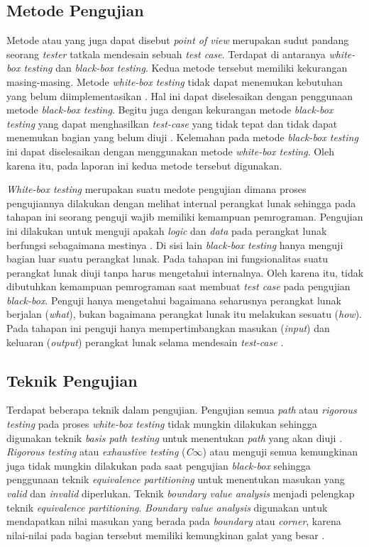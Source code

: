 \subsection{Metode Pengujian}

Metode atau yang juga dapat disebut \emph{point of view} merupakan
sudut pandang seorang \emph{tester} tatkala mendesain sebuah
\emph{test case}. Terdapat di antaranya \emph{white-box testing} dan
\emph{black-box testing}. Kedua metode tersebut memiliki kekurangan
masing-masing. Metode \emph{white-box testing} tidak dapat menemukan
kebutuhan yang belum diimplementasikan
\parencite{dijkstra1970notes}. Hal ini dapat diselesaikan dengan
penggunaan metode \emph{black-box testing}. Begitu juga dengan
kekurangan metode \emph{black-box testing} yang dapat menghasilkan
\emph{test-case} yang tidak tepat dan tidak dapat menemukan bagian
yang belum diuji \parencite{savenkov2008become}. Kelemahan pada metode
\emph{black-box testing} ini dapat diselesaikan dengan menggunakan
metode \emph{white-box testing}. Oleh karena itu, pada laporan ini
kedua metode tersebut digunakan.

\emph{White-box testing} merupakan suatu medote pengujian dimana
proses pengujiannya dilakukan dengan melihat internal perangkat lunak
sehingga pada tahapan ini seorang penguji wajib memiliki kemampuan
pemrograman. Pengujian ini dilakukan untuk menguji apakah \emph{logic}
dan \emph{data} pada perangkat lunak berfungsi sebagaimana mestinya
\parencite{myers2011art}. Di sisi lain \emph{black-box testing} hanya
menguji bagian luar suatu perangkat lunak. Pada tahapan ini
fungsionalitas suatu perangkat lunak diuji tanpa harus mengetahui
internalnya. Oleh karena itu, tidak dibutuhkan kemampuan pemrograman
saat membuat \emph{test case} pada pengujian \emph{black-box}. Penguji
hanya mengetahui bagaimana seharusnya perangkat lunak berjalan
(\emph{what}), bukan bagaimana perangkat lunak itu melakukan sesuatu
(\emph{how}). Pada tahapan ini penguji hanya mempertimbangkan masukan
(\emph{input}) dan keluaran (\emph{output}) perangkat lunak selama
mendesain \emph{test-case} \parencite{myers2011art}.


\subsection{Teknik Pengujian}

Terdapat beberapa teknik dalam pengujian. Pengujian semua \emph{path}
atau \emph{rigorous testing} pada proses \emph{white-box testing}
tidak mungkin dilakukan sehingga digunakan teknik \emph{basis path
testing} untuk menentukan \emph{path} yang akan diuji
\parencite{gregory2007path}. \emph{Rigorous testing} atau
\emph{exhaustive testing} (\emph{C$\infty$}) atau menguji semua
kemungkinan juga tidak mungkin dilakukan pada saat pengujian
\emph{black-box} sehingga penggunaan teknik \emph{equivalence
partitioning} untuk menentukan masukan yang \emph{valid} dan
\emph{invalid} diperlukan. Teknik \emph{boundary value analysis}
menjadi pelengkap teknik \emph{equivalence
partitioning}. \emph{Boundary value analysis} digunakan untuk
mendapatkan nilai masukan yang berada pada \emph{boundary} atau
\emph{corner}, karena nilai-nilai pada bagian tersebut memiliki
kemungkinan galat yang besar \parencite{presman2010software}.

